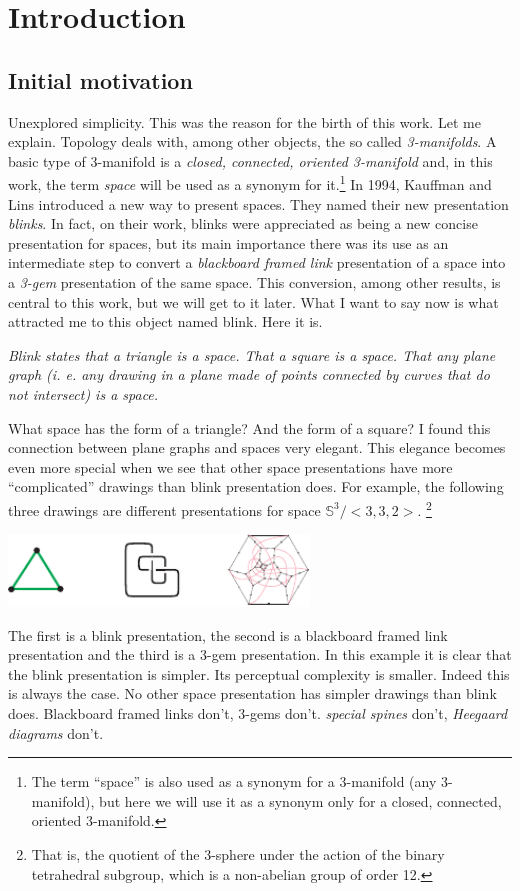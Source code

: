 \section{Introduction}
\subsection{Initial motivation}
\label{sec:initialMotivation}

Unexplored simplicity. This was the reason for the birth of this work.
Let me explain. Topology deals with, among other objects, the so
called {\em 3-manifolds}. A basic type of 3-manifold is a {\em
closed, connected, oriented 3-manifold} and, in this work, the term
{\em space} will be used as a synonym for it.\footnote{The term
``space'' is also used as a synonym for a 3-manifold (any
3-manifold), but here we will use it as a synonym only for a closed,
connected, oriented 3-manifold.} In 1994, Kauffman and Lins
\cite{kauffman1994tlr} introduced a new way to present spaces.
They named their new presentation {\em blinks}. In fact, on their
work, blinks were appreciated as being a new concise presentation
for spaces, but its main importance there was its use as an
intermediate step to convert a {\em blackboard framed link}
presentation of a space into a {\em 3-gem} presentation of the same
space. This conversion, among other results, is central to this work,
but we will get to it later. What I want to say now is what
attracted me to this object named blink. Here it is.
\vspace{-0.3cm}
{\begin{center} \it
Blink states that a triangle is a space. That a square is a space.
That any plane graph (i. e. any drawing in a plane made of
points connected by curves that do not intersect) is a space.
\end{center}}
\vspace{-0.3cm}
\noindent What space has the form of a
triangle? And the form of a square? I found this connection
between plane graphs and spaces very elegant. This elegance
becomes even more special when we see that other space
presentations have more ``complicated'' drawings than
blink presentation does. For example, the following three
drawings are different presentations for space 
$\mathbb{S}^3\!/\!<3,3,2>$. \footnote{That is, the quotient of the $3$-sphere
under the action of the binary tetrahedral subgroup, which is a non-abelian group of order 12.}
\begin{center}
\includegraphics[width=8cm]{E.figsbw2/presentations.pdf}
\end{center}
The first is a blink presentation, the second is a blackboard
framed link presentation and the third is a 3-gem presentation.
In this example it is clear that the blink presentation is
simpler. Its perceptual complexity is smaller. Indeed this is
always the case. No other space presentation has simpler drawings
than blink does. Blackboard framed links don't, 3-gems don't.
{\it special spines} don't, {\it Heegaard diagrams} don't.

